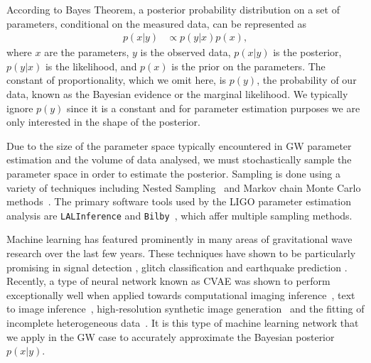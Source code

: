 \documentclass[%
showpacs,
 amsmath,amssymb,
 aps,
 twocolumn,
 prl,
 reprint,
floatfix,
]{revtex4-1}
\begin{document}
%
%
According to Bayes Theorem, a posterior probability distribution on a set of
parameters, conditional on the measured data, can be represented as
%
\begin{align}\label{eq:bayes_theorem} 
p(x|y) &\propto p(y|x) p(x), 
\end{align}
%
where $x$ are the parameters, $y$ is the observed data, $p(x|y)$ is the
posterior, $p(y|x)$ is the likelihood, and $p(x)$ is the prior on the
parameters. The constant of proportionality, which we omit here, is
$p(y)$, the probability of our data, known as the Bayesian evidence or the
marginal likelihood. We typically ignore $p(y)$ since it is a constant and for
parameter estimation purposes we are only interested in the shape of the
posterior.

%
%
Due to the size of the parameter space typically encountered in \ac{GW}
parameter estimation and the volume of data analysed, we must stochastically
sample the parameter space in order to estimate the posterior.  Sampling is
done using a variety of techniques including Nested
Sampling~\cite{skilling2006,cpnest,dynesty} and Markov chain Monte Carlo
methods~\cite{emcee,ptemcee}. The primary software tools used by the \ac{LIGO}
parameter estimation analysis are \texttt{LALInference} and
\texttt{Bilby}~\cite{1409.7215,1811.02042}, which affer multiple sampling
methods.  
  
%
%
Machine learning has featured prominently in many areas of gravitational wave
research over the last few years. These techniques have shown to be
particularly promising in signal detection
\cite{GEORGE201864,PhysRevLett.120.141103,1904.08693}, glitch classification
\cite{1706.07446,0264-9381-34-6-064003} and earthquake prediction
\cite{Coughlin_2017}. Recently, a type of neural network known as \ac{CVAE} was
shown to perform exceptionally well when applied towards computational imaging
inference~\cite{1904.06264,NIPS2015_5775}, text to image
inference~\cite{1512.00570}, high-resolution synthetic image
generation~\cite{1612.00005} and the fitting of incomplete heterogeneous
data~\cite{1807.03653}. It is this type of machine learning network that we
apply in the \ac{GW} case to accurately approximate the Bayesian posterior
$p(x|y)$.
\end{document}
